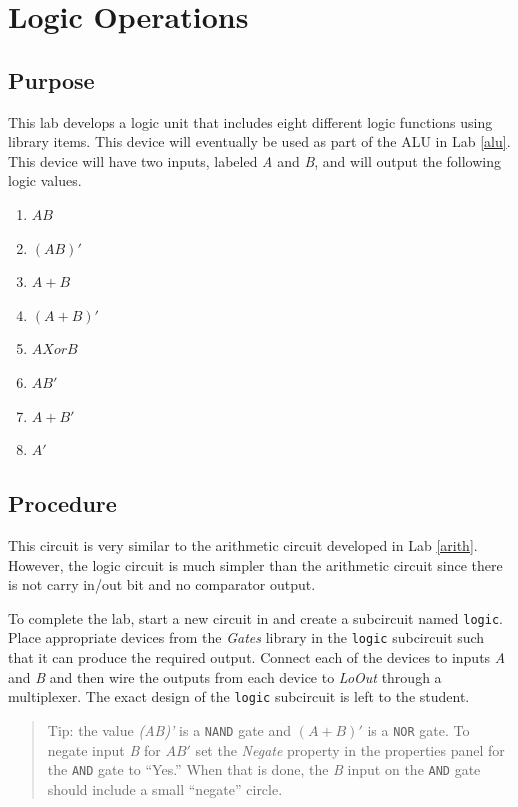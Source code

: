 \chapter{Logic Operations}\label{logic}

\section{Purpose}

This lab develops a logic unit that includes eight different logic functions using \LE library items. This device will eventually be used as part of the \acf{ALU} in Lab \ref{alu}. This device will have two inputs, labeled \textit{A} and \textit{B}, and will output the following logic values.

\begin{enumerate}
	\item $ AB $
	\item $ (AB)' $
	\item $ A+B $
	\item $ (A+B)' $
	\item $ A Xor B $
	\item $ AB' $
	\item $ A+B' $
	\item $ A' $
\end{enumerate}

\section{Procedure}

This circuit is very similar to the arithmetic circuit developed in Lab \ref{arith}. However, the logic circuit is much simpler than the arithmetic circuit since there is not carry in/out bit and no comparator output.

To complete the lab, start a new circuit in \LE and create a subcircuit named \lstinline[columns=fixed]|logic|. Place appropriate devices from the \textit{Gates} library in the \lstinline[columns=fixed]|logic| subcircuit such that it can produce the required output. Connect each of the devices to inputs \textit{A} and \textit{B} and then wire the outputs from each device to \textit{LoOut} through a multiplexer. The exact design of the \lstinline[columns=fixed]|logic| subcircuit is left to the student.

\begin{quotation}
	Tip: the value \textit{(AB)'} is a \texttt{NAND} gate and $ (A+B)' $ is a \texttt{NOR} gate. To negate input \textit{B} for $ AB' $ set the \textit{Negate} property in the properties panel for the \texttt{AND} gate to ``Yes.'' When that is done, the \textit{B} input on the \texttt{AND} gate should include a small ``negate'' circle.
\end{quotation}

